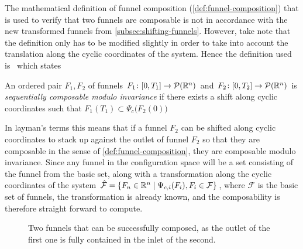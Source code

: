 The mathematical definition of funnel composition
(\cref{def:funnel-composition}) that is used to verify that two funnels are
composable is not in accordance with the new transformed funnels from
\cref{subsec:shifting-funnels}. However, take note that the definition only has
to be modified slightly in order to take into account the translation along the
cyclic coordinates of the system. Hence the definition used
is~\cite[definition~3,sec~5]{majumdarFunnelLibrariesRealtime2017} which states
\begin{definition}
  \label{def:invarant-funnel-composition}
  An ordered pair \(F_1,F_2\) of funnels \(F_1 \colon [0,T_1] \rightarrow
  \mathcal{P}(\mathbb{R}^n)\) and \(F_2 \colon [0,T_2] \rightarrow \mathcal{P}(\mathbb{R}^n)\)
  is \textit{sequentially composable modulo invariance} if there exists a shift
  along cyclic coordinates such that \(F_{1}(T_1) \subset
  \Psi_{c}\bigl(F_2(0)\bigr) \)
\end{definition}
In layman's terms this means that if a funnel \(F_2\) can be shifted along
cyclic coordinates to stack up against the outlet of funnel \(F_2\) so that they
are composable in the sense of \cref{def:funnel-composition}, they are
composable modulo invariance. Since any funnel in the configuration space will
be a set consisting of the funnel from the basic set, along with a
transformation along the cyclic coordinates of the system \(\hat{\mathcal{F}} =
\lbrace F_n \in \mathbb{R}^n \mid \Psi_{c,i}(F_i), F_i \in \mathcal{F}\rbrace\), where
\(\mathcal{F}\) is the basic set of funnels, the transformation is already
known, and the composability is therefore straight forward to compute.

\begin{figure}
  \caption{Two funnels that can be successfully composed, as the outlet of the
    first one is fully contained in the inlet of the second.}
  \label{fig:two-funnels-composed}
\end{figure}


